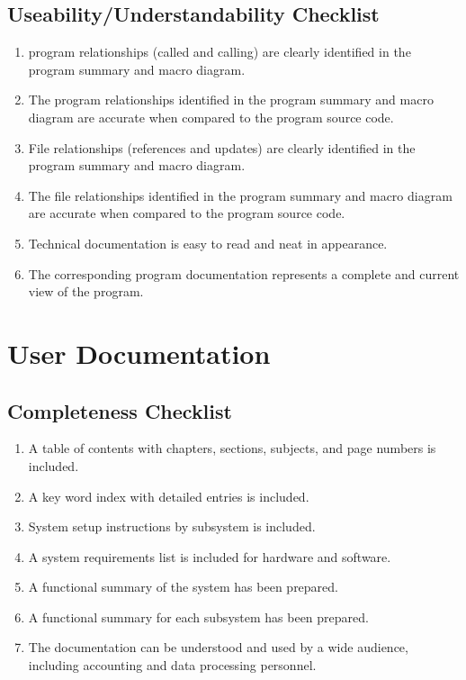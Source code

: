  \section {Useability/Understandability Checklist}
 \begin{enumerate}
  \item program relationships (called and calling) are clearly identified
    in the program summary and macro diagram.
  \item The program relationships identified in the program summary and
    macro diagram are accurate when compared to the program source code.
  \item File relationships (references and updates) are clearly
    identified in the program summary and macro diagram.
  \item The file relationships identified in the program summary and
    macro diagram are accurate when compared to the program source
    code.
  \item Technical documentation is easy to read and neat in appearance.
  \item The corresponding program documentation represents a complete
    and current view of the program.
 \end{enumerate}
\chapter{User Documentation}
 \section {Completeness Checklist}
 \begin{enumerate}
  \item A table of contents with chapters, sections, subjects, and
    page numbers is included.
  \item A key word index with detailed entries is included.
  \item System setup instructions by subsystem is included.
  \item A system requirements list is included for hardware and software.
  \item A functional summary of the system has been prepared.
  \item A functional summary for each subsystem has been prepared.
  \item The documentation can be understood and used by a wide
    audience, including accounting and data processing personnel.
 \end{enumerate}
